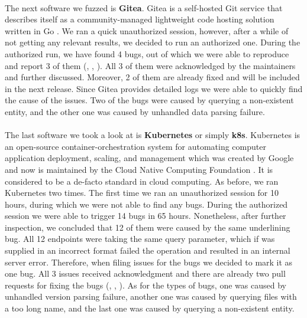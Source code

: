 \paragraph{}
The next software we fuzzed is \textbf{Gitea}. Gitea is a self-hosted Git service that describes itself as a community-managed lightweight code hosting solution written in Go \cite{gitea2020web}. We ran a quick unauthorized session, however, after a while of not getting any relevant results, we decided to run an authorized one. During the authorized run, we have found 4 bugs, out of which we were able to reproduce and report 3 of them (\cite{giteaissue15346github}, \cite{giteaissue15357github}, \cite{giteaissue15356github}). All 3 of them were acknowledged by the maintainers and further discussed. Moreover, 2 of them are already fixed and will be included in the next release. Since Gitea provides detailed logs we were able to quickly find the cause of the issues. Two of the bugs were caused by querying a non-existent entity, and the other one was caused by unhandled data parsing failure.

\paragraph{}
The last software we took a look at is \textbf{Kubernetes} or simply \textbf{k8s}. Kubernetes is an open-source container-orchestration system for automating computer application deployment, scaling, and management which was created by Google and now is maintained by the Cloud Native Computing Foundation \cite{k8s2021web}. It is considered to be a de-facto standard in cloud computing. As before, we ran Kubernetes two times. The first time we ran an unauthorized session for 10 hours, during which we were not able to find any bugs. During the authorized session we were able to trigger 14 bugs in 65 hours. Nonetheless, after further inspection, we concluded that 12 of them were caused by the same underlining bug. All 12 endpoints were taking the same query parameter, which if was supplied in an incorrect format failed the operation and resulted in an internal server error. Therefore, when filing issues for the bugs we decided to mark it as one bug. All 3 issues received acknowledgment and there are already two pull requests for fixing the bugs (\cite{k8sissue101355github}, \cite{k8sissue101350github}, \cite{k8sissue101348github}). As for the types of bugs, one was caused by unhandled version parsing failure, another one was caused by querying files with a too long name, and the last one was caused by querying a non-existent entity.

